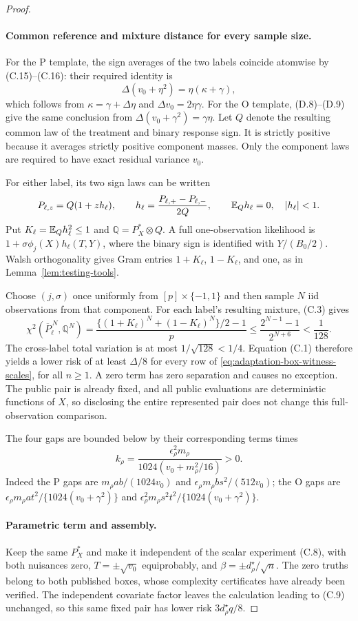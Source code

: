 \begin{proof}
\paragraph{Common reference and mixture distance for every sample size.}
For the P template, the sign averages of the two labels coincide
atomwise by (C.15)--(C.16): their required identity is
\[
 \Delta(v_0+\eta^2)=\eta(\kappa+\gamma),
\]
which follows from $\kappa=\gamma+\Delta\eta$ and
$\Delta v_0=2\eta\gamma$. For the O template, (D.8)--(D.9) give the
same conclusion from $\Delta(v_0+\gamma^2)=\gamma\eta$.
Let $Q$ denote the resulting common law of the treatment and binary
response sign. It is strictly positive because it averages strictly
positive component masses. Only the component laws are required to
have exact residual variance $v_0$.

For either label, its two sign laws can be written
\[
 P_{\ell,z}=Q(1+z h_\ell),\qquad
 h_\ell=\frac{P_{\ell,+}-P_{\ell,-}}{2Q},\qquad
 \mathbb E_Qh_\ell=0,\quad |h_\ell|<1.
\]
Put $K_\ell=\mathbb E_Qh_\ell^2\le1$ and
$\mathbb Q=P_X^*\otimes Q$. A full one-observation likelihood is
$1+\sigma\phi_j(X)h_\ell(T,Y)$, where the binary sign is identified
with $Y/(B_0/2)$. Walsh orthogonality gives Gram entries
$1+K_\ell$, $1-K_\ell$, and one, as in Lemma~\ref{lem:testing-tools}.

Choose $(j,\sigma)$ once uniformly from $[p]\times\{-1,1\}$ and then
sample $N$ iid observations from that component. For each label's
resulting mixture, (C.3) gives
\[
 \chi^2(\overline P_\ell^{\,N},\mathbb Q^N)
 =\frac{\{(1+K_\ell)^N+(1-K_\ell)^N\}/2-1}{p}
 \le\frac{2^{N-1}-1}{2^{N+6}}<\frac1{128}.
\]
The cross-label total variation is at most $1/\sqrt{128}<1/4$.
Equation (C.1) therefore yields a lower risk of at least $\Delta/8$
for every row of \eqref{eq:adaptation-box-witness-scales}, for all
$n\ge1$. A zero term has zero
separation and causes no exception. The public pair is already fixed,
and all public evaluations are deterministic functions of $X$, so
disclosing the entire represented pair does not change this
full-observation comparison.

The four gaps are bounded below by their corresponding terms times
\[
 k_\rho=\frac{\epsilon_\rho^2m_\rho}
                {1024(v_0+m_\rho^2/16)}>0.
\]
Indeed the P gaps are
$m_\rho ab/(1024v_0)$ and
$\epsilon_\rho m_\rho bs^2/(512v_0)$; the O gaps are
$\epsilon_\rho m_\rho at^2/\{1024(v_0+\gamma^2)\}$ and
$\epsilon_\rho^2m_\rho s^2t^2/\{1024(v_0+\gamma^2)\}$.

\paragraph{Parametric term and assembly.}
Keep the same $P_X^*$ and make it independent of the scalar experiment
(C.8), with both nuisances zero, $T=\pm\sqrt{v_0}$ equiprobably, and
$\beta=\pm d_\rho^\star/\sqrt n$. The zero truths belong to both
published boxes, whose complexity certificates have already been
verified. The independent covariate factor leaves the calculation
leading to (C.9) unchanged, so this same fixed pair has lower risk
$3d_\rho^\star q/8$.


\end{proof}
